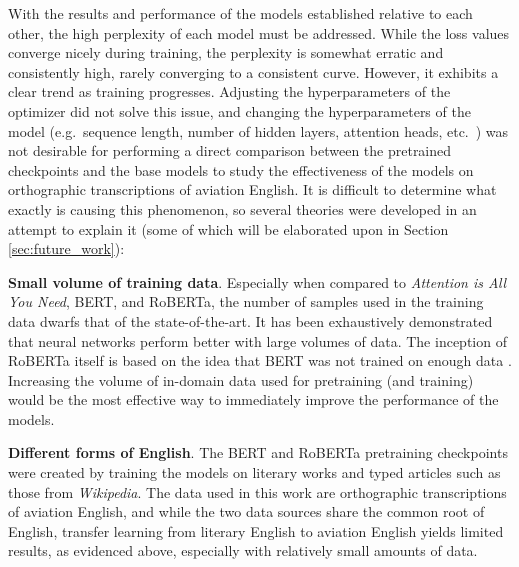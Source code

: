 \documentclass[12pt]{article}
\begin{document}
With the results and performance of the models established relative to each other, the high perplexity of each model must be addressed. While the loss values converge nicely during training, the perplexity is somewhat erratic and consistently high, rarely converging to a consistent curve. However, it exhibits a clear trend as training progresses. Adjusting the hyperparameters of the optimizer did not solve this issue, and changing the hyperparameters of the model (e.g.~sequence length, number of hidden layers, attention heads, etc.~) was not desirable for performing a direct comparison between the pretrained checkpoints and the base models to study the effectiveness of the models on orthographic transcriptions of aviation English. It is difficult to determine what exactly is causing this phenomenon, so several theories were developed in an attempt to explain it (some of which will be elaborated upon in Section \ref{sec:future_work}):

\textbf{Small volume of training data}. Especially when compared to \textit{Attention is All You Need}, BERT, and RoBERTa, \cite{vaswani_attention_2017,devlin_bert_2019,liu_roberta_2019} the number of samples used in the training data dwarfs that of the state-of-the-art. It has been exhaustively demonstrated that neural networks perform better with large volumes of data. The inception of RoBERTa itself is based on the idea that BERT was not trained on enough data \cite{liu_roberta_2019}. Increasing the volume of in-domain data used for pretraining (and training) would be the most effective way to immediately improve the performance of the models.

\textbf{Different forms of English}. The BERT and RoBERTa pretraining checkpoints were created by training the models on literary works and typed articles such as those from \textit{Wikipedia}. The data used in this work are orthographic transcriptions of aviation English, and while the two data sources share the common root of English, transfer learning from literary English to aviation English yields limited results, as evidenced above, especially with relatively small amounts of data.
\end{document}
